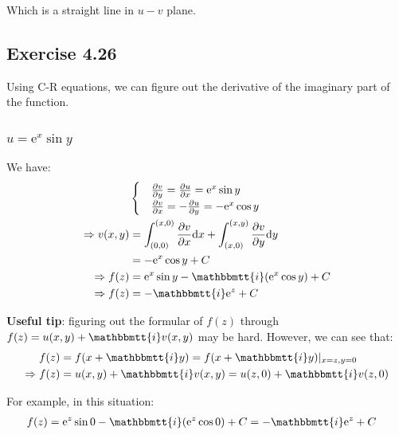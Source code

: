 \documentclass[]{ctexart}
\newcommand{\mi}{\mathbbmtt{i}}
\newcommand{\di}{\mathrm{d}}
\newcommand{\pa}{\partial}
\newcommand{\me}{\mathrm{e}}
\begin{document}
		Which is a straight line in $u-v$ plane. 
	\subsection{Exercise 4.26}
		Using C-R equations, we can figure out the derivative of the imaginary part of the function.
			\subsubsection{$u=\me ^x \sin y $}
				We have:
					\begin{equation*}
					\begin{aligned}
						&\begin{cases}
							&\frac{\pa v}{\pa y}=\frac{\pa u}{\pa x}=\me ^x \sin y\\
							&\frac{\pa v}{\pa x}=-\frac{\pa u}{\pa y}=-\me ^x \cos  y
						\end{cases}\\
						\Rightarrow v(x,y)&=\int_{(0,0)}^{(x,0)}\frac{\pa v}{\pa x} \di x+\int_{(x,0)}^{(x,y)}\frac{\pa v}{\pa y} \di y\\
						&=-\me ^x \cos  y+C\\
						\Rightarrow f(z)&=\me ^x \sin y-\mi (\me ^x \cos  y)+C\\
						\Rightarrow f(z)&=-\mi \me ^z+C
					\end{aligned}
					\end{equation*}
					
			\textbf{	Useful tip}: figuring out the formular of $f(z)$ through $f(z)=u(x,y)+\mi v(x,y)$ may be hard. However, we can see that:
				\begin{equation*}
				\begin{aligned}
					f(z)&=f(x+\mi y)=f(x+\mi y)|_{x=z,y=0}\\
					\Rightarrow f(z)&=u(x,y)+\mi v(x,y)=u(z,0)+\mi v(z,0)
				\end{aligned}
				\end{equation*}
				
			For example, in this situation:
				\begin{equation*}
				\begin{aligned}
					f(z)&=\me ^z \sin 0-\mi (\me ^z\cos 0)+C=-\mi \me ^z+C
				\end{aligned}
				\end{equation*}
				
\end{document}
